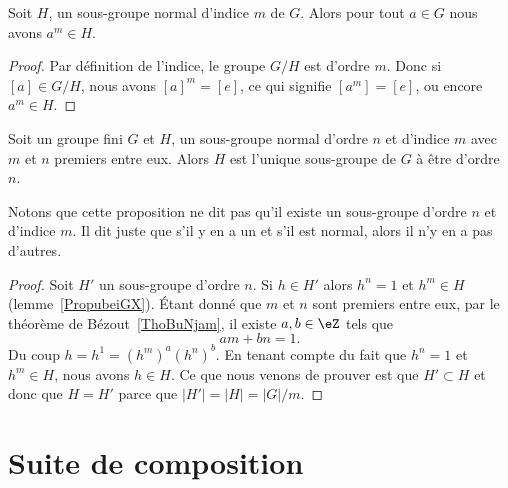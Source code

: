 \begin{lemma}\label{PropubeiGX}
    Soit \( H\), un sous-groupe normal d'indice \( m\) de \( G\). Alors pour tout \( a\in G\) nous avons \( a^m\in H\).
\end{lemma}

\begin{proof}
    Par définition de l'indice, le groupe \( G/H\) est d'ordre \( m\). Donc si \( [a]\in G/H\), nous avons \( [a]^m=[e]\), ce qui signifie \( [a^m]=[e]\), ou encore \( a^m\in H\).
\end{proof}

\begin{proposition}
    Soit un groupe fini \( G\) et \( H\), un sous-groupe normal d'ordre \( n\) et d'indice \( m\) avec \( m\) et \( n\) premiers entre eux. Alors \( H\) est l'unique sous-groupe de \( G\) à être d'ordre \( n\).
\end{proposition}
Notons que cette proposition ne dit pas qu'il existe un sous-groupe d'ordre \( n\) et d'indice \( m\). Il dit juste que s'il y en a un et s'il est normal, alors il n'y en a pas d'autres.

\begin{proof}
    Soit \( H'\) un sous-groupe d'ordre \( n\). Si \( h\in H'\) alors \( h^n=1\) et \( h^m\in H\) (lemme~\ref{PropubeiGX}). Étant donné que \( m\) et \( n\) sont premiers entre eux, par le théorème de Bézout~\ref{ThoBuNjam}, il existe \( a,b\in \eZ\) tels que
    \begin{equation}
        am+bn=1.
    \end{equation}
    Du coup \( h=h^1=(h^m)^a(h^n)^b\). En tenant compte du fait que \( h^n=1\) et \( h^m\in H\), nous avons \( h\in H\). Ce que nous venons de prouver est que \( H'\subset H\) et donc que \( H=H'\) parce que \( | H' |=| H |=| G |/m\).
\end{proof}

\section{Suite de composition}


